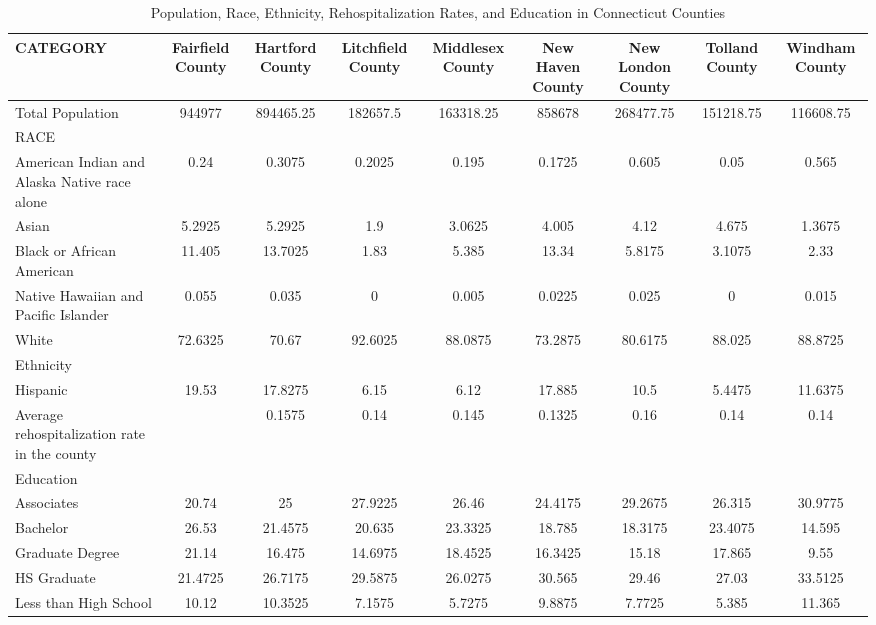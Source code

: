 \documentclass[12pt]{article}
\begin{document}
\begin{table}[H]
    \centering
    \caption{Population, Race, Ethnicity, Rehospitalization Rates, and Education in Connecticut Counties}
    \label{tab:connecticut-counties}
    \begin{tabular}{l|cccccccc}
    \hline
    \textbf{CATEGORY} & \textbf{Fairfield County} & \textbf{Hartford County} & \textbf{Litchfield County} & \textbf{Middlesex County} & \textbf{New Haven County} & \textbf{New London County} & \textbf{Tolland County} & \textbf{Windham County} \\ \hline
    Total Population & 944977 & 894465.25 & 182657.5 & 163318.25 & 858678 & 268477.75 & 151218.75 & 116608.75 \\
    RACE &  &  &  &  &  &  &  &  \\
    American Indian and Alaska Native race alone & 0.24 & 0.3075 & 0.2025 & 0.195 & 0.1725 & 0.605 & 0.05 & 0.565 \\
    Asian & 5.2925 & 5.2925 & 1.9 & 3.0625 & 4.005 & 4.12 & 4.675 & 1.3675 \\
    Black or African American & 11.405 & 13.7025 & 1.83 & 5.385 & 13.34 & 5.8175 & 3.1075 & 2.33 \\
    Native Hawaiian and Pacific Islander & 0.055 & 0.035 & 0 & 0.005 & 0.0225 & 0.025 & 0 & 0.015 \\
    White & 72.6325 & 70.67 & 92.6025 & 88.0875 & 73.2875 & 80.6175 & 88.025 & 88.8725 \\
    Ethnicity &  &  &  &  &  &  &  &  \\
    Hispanic & 19.53 & 17.8275 & 6.15 & 6.12 & 17.885 & 10.5 & 5.4475 & 11.6375 \\
    Average rehospitalization rate in the county &  & 0.1575 & 0.14 & 0.145 & 0.1325 & 0.16 & 0.14 & 0.14 \\
    Education &  &  &  &  &  &  &  &  \\
    Associates & 20.74 & 25 & 27.9225 & 26.46 & 24.4175 & 29.2675 & 26.315 & 30.9775 \\
    Bachelor & 26.53 & 21.4575 & 20.635 & 23.3325 & 18.785 & 18.3175 & 23.4075 & 14.595 \\
    Graduate Degree & 21.14 & 16.475 & 14.6975 & 18.4525 & 16.3425 & 15.18 & 17.865 & 9.55 \\
    HS Graduate & 21.4725 & 26.7175 & 29.5875 & 26.0275 & 30.565 & 29.46 & 27.03 & 33.5125 \\
    Less than High School & 10.12 & 10.3525 & 7.1575 & 5.7275 & 9.8875 & 7.7725 & 5.385 & 11.365 \\ \hline
    \end{tabular}
    \end{table}    
\end{document}
